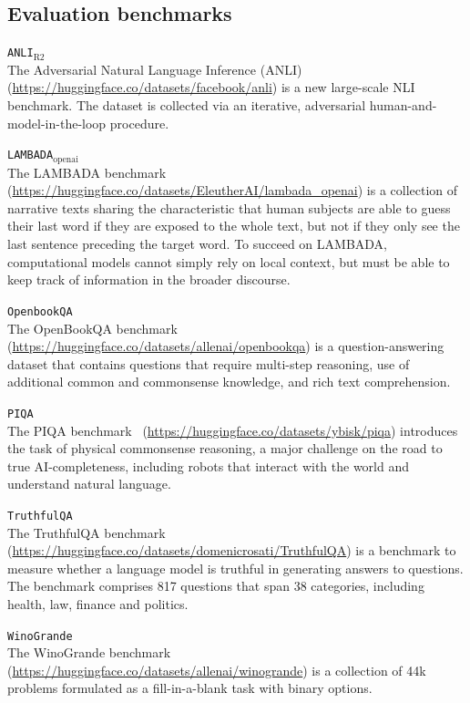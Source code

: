 \documentclass{article}
\theoremstyle{plain}
\theoremstyle{definition}
\theoremstyle{remark}
\begin{document}
\begin{appendices}
\subsection{Evaluation benchmarks}
\label{sec:benchmark_description}

\texttt{ANLI$_\text{R2}$}\\The Adversarial Natural Language Inference (ANLI)~\cite{ANLI} (\url{https://huggingface.co/datasets/facebook/anli}) is a new large-scale NLI benchmark. The dataset is collected via an iterative, adversarial human-and-model-in-the-loop procedure.

\texttt{LAMBADA$_\text{openai}$}\\The LAMBADA benchmark~\cite{LAMBADA} (\url{https://huggingface.co/datasets/EleutherAI/lambada_openai}) is a collection of narrative texts sharing the characteristic that human subjects are able to guess their last word if they are exposed to the whole text, but not if they only see the last sentence preceding the target word. To succeed on LAMBADA, computational models cannot simply rely on local context, but must be able to keep track of information in the broader discourse.

\texttt{OpenbookQA}\\The OpenBookQA benchmark~\cite{OpenbookQA} (\url{https://huggingface.co/datasets/allenai/openbookqa}) is a question-answering dataset that contains questions that require multi-step reasoning, use of additional common and commonsense knowledge, and rich text comprehension.

\texttt{PIQA}\\The PIQA benchmark~\cite{PIQA} (\url{https://huggingface.co/datasets/ybisk/piqa}) introduces the task of physical commonsense reasoning, a major challenge on the road to true AI-completeness, including robots that interact with the world and understand natural language.

\texttt{TruthfulQA}\\The TruthfulQA benchmark~\cite{TruthfulQA} (\url{https://huggingface.co/datasets/domenicrosati/TruthfulQA}) is a benchmark to measure whether a language model is truthful in generating answers to questions. The benchmark comprises 817 questions that span 38 categories, including health, law, finance and politics.

\texttt{WinoGrande}\\The WinoGrande benchmark~\cite{WinoGrande} (\url{https://huggingface.co/datasets/allenai/winogrande}) is a collection of 44k problems formulated as a fill-in-a-blank task with binary options.


\end{appendices}
\end{document}
